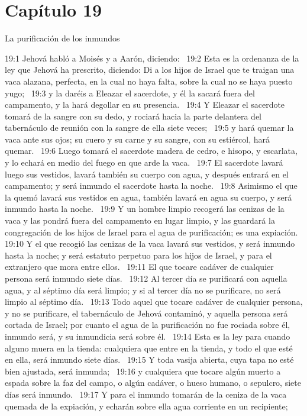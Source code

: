 \section*{Capítulo 19}
La purificación de los inmundos  

19:1 Jehová habló a Moisés y a Aarón, diciendo:  
19:2 Esta es la ordenanza de la ley que Jehová ha prescrito, diciendo: Di a los hijos de Israel que te traigan una vaca alazana, perfecta, en la cual no haya falta, sobre la cual no se haya puesto yugo;  
19:3 y la daréis a Eleazar el sacerdote, y él la sacará fuera del campamento, y la hará degollar en su presencia.  
19:4 Y Eleazar el sacerdote tomará de la sangre con su dedo, y rociará hacia la parte delantera del tabernáculo de reunión con la sangre de ella siete veces;  
19:5 y hará quemar la vaca ante sus ojos; su cuero y su carne y su sangre, con su estiércol, hará quemar.  
19:6 Luego tomará el sacerdote madera de cedro, e hisopo, y escarlata, y lo echará en medio del fuego en que arde la vaca.  
19:7 El sacerdote lavará luego sus vestidos, lavará también su cuerpo con agua, y después entrará en el campamento; y será inmundo el sacerdote hasta la noche.  
19:8 Asimismo el que la quemó lavará sus vestidos en agua, también lavará en agua su cuerpo, y será inmundo hasta la noche.  
19:9 Y un hombre limpio recogerá las cenizas de la vaca y las pondrá fuera del campamento en lugar limpio, y las guardará la congregación de los hijos de Israel para el agua de purificación; es una expiación.  
19:10 Y el que recogió las cenizas de la vaca lavará sus vestidos, y será inmundo hasta la noche; y será estatuto perpetuo para los hijos de Israel, y para el extranjero que mora entre ellos.  
19:11 El que tocare cadáver de cualquier persona será inmundo siete días.  
19:12 Al tercer día se purificará con aquella agua, y al séptimo día será limpio; y si al tercer día no se purificare, no será limpio al séptimo día.  
19:13 Todo aquel que tocare cadáver de cualquier persona, y no se purificare, el tabernáculo de Jehová contaminó, y aquella persona será cortada de Israel; por cuanto el agua de la purificación no fue rociada sobre él, inmundo será, y su inmundicia será sobre él.  
19:14 Esta es la ley para cuando alguno muera en la tienda: cualquiera que entre en la tienda, y todo el que esté en ella, será inmundo siete días.  
19:15 Y toda vasija abierta, cuya tapa no esté bien ajustada, será inmunda;  
19:16 y cualquiera que tocare algún muerto a espada sobre la faz del campo, o algún cadáver, o hueso humano, o sepulcro, siete días será inmundo.  
19:17 Y para el inmundo tomarán de la ceniza de la vaca quemada de la expiación, y echarán sobre ella agua corriente en un recipiente;  

